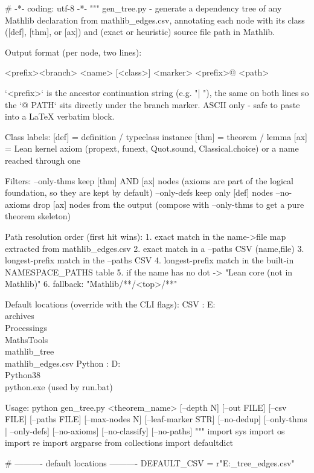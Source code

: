 \documentclass[11pt,reqno]{amsart}
\begin{document}
\text{ \ } \text{ \ } 
\begin{verbatimbox}
# -*- coding: utf-8 -*-
"""
gen_tree.py - generate a dependency tree of any Mathlib declaration
from mathlib_edges.csv, annotating each node with its
class ([def], [thm], or [ax]) and (exact or heuristic)
source file path in Mathlib.

Output format (per node, two lines):

<prefix><branch> <name>  [<class>]   <marker>
<prefix>@ <path>

`<prefix>` is the ancestor continuation string (e.g. "|   "), the
same on both lines so the `@ PATH` sits directly under the branch
marker.  ASCII only - safe to paste into a LaTeX verbatim block.

Class labels:
[def] = definition / typeclass instance
[thm] = theorem / lemma
[ax]  = Lean kernel axiom (propext, funext, Quot.sound,
Classical.choice) or a name reached through one

Filters:
--only-thms   keep [thm] AND [ax] nodes (axioms are part of the
logical foundation, so they are kept by default)
--only-defs   keep only [def] nodes
--no-axioms   drop [ax] nodes from the output (compose with
--only-thms to get a pure theorem skeleton)

Path resolution order (first hit wins):
1. exact match in the name->file map extracted from mathlib_edges.csv
2. exact match in a --paths CSV (name,file)
3. longest-prefix match in the --paths CSV
4. longest-prefix match in the built-in NAMESPACE_PATHS table
5. if the name has no dot -> "Lean core (not in Mathlib)"
6. fallback: "Mathlib/**/<top>/**"

Default locations (override with the CLI flags):
CSV     : E:\\archives\\Processings\\MathsTools\\mathlib_tree\\mathlib_edges.csv
Python  : D:\\Python38\\python.exe   (used by run.bat)

Usage:
python gen_tree.py <theorem_name> [--depth N] [--out FILE] [--csv FILE]
[--paths FILE] [--max-nodes N]
[--leaf-marker STR] [--no-dedup]
[--only-thms | --only-defs]
[--no-axioms]
[--no-classify] [--no-paths]
"""
import sys
import os
import re
import argparse
from collections import defaultdict

# ---------- default locations ----------
DEFAULT_CSV = r"E:\archives\Processings\MathsTools\mathlib_tree\mathlib_edges.csv"


\end{verbatimbox}
\end{document}
